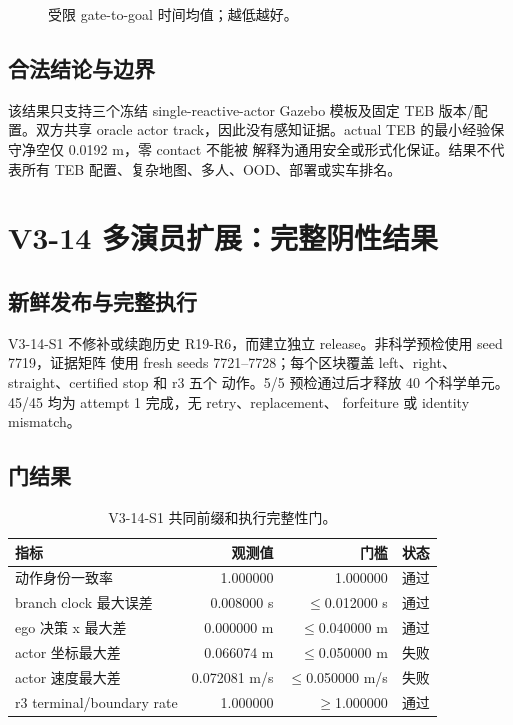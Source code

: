 \documentclass[12pt,a4paper,oneside]{report}
\newcommand{\ok}{\textcolor{vgreen}{通过}}
\newcommand{\fail}{\textcolor{vred}{失败}}
\begin{document}
\begin{figure}[htbp]
\centering
{}
\caption{受限 gate-to-goal 时间均值；越低越好。}
\label{fig:v311}
\end{figure}

\section{合法结论与边界}
该结果只支持三个冻结 single-reactive-actor Gazebo 模板及固定 TEB 版本/配置。双方共享 oracle
actor track，因此没有感知证据。actual TEB 的最小经验保守净空仅 0.0192 m，零 contact 不能被
解释为通用安全或形式化保证。结果不代表所有 TEB 配置、复杂地图、多人、OOD、部署或实车排名。

\chapter{V3-14 多演员扩展：完整阴性结果}
\section{新鲜发布与完整执行}
V3-14-S1 不修补或续跑历史 R19-R6，而建立独立 release。非科学预检使用 seed 7719，证据矩阵
使用 fresh seeds 7721--7728；每个区块覆盖 left、right、straight、certified stop 和 r3 五个
动作。5/5 预检通过后才释放 40 个科学单元。45/45 均为 attempt 1 完成，无 retry、replacement、
forfeiture 或 identity mismatch。

\section{门结果}
\begin{table}[htbp]
\centering
\caption{V3-14-S1 共同前缀和执行完整性门。}
\begin{tabular}{lrrl}
\toprule
指标 & 观测值 & 门槛 & 状态\\
\midrule
动作身份一致率 & 1.000000 & 1.000000 & \ok\\
branch clock 最大误差 & 0.008000 s & $\leq$0.012000 s & \ok\\
ego 决策 x 最大差 & 0.000000 m & $\leq$0.040000 m & \ok\\
actor 坐标最大差 & 0.066074 m & $\leq$0.050000 m & \fail\\
actor 速度最大差 & 0.072081 m/s & $\leq$0.050000 m/s & \fail\\
r3 terminal/boundary rate & 1.000000 & $\geq$1.000000 & \ok\\
\bottomrule
\end{tabular}
\label{tab:v314}
\end{table}
\end{document}
